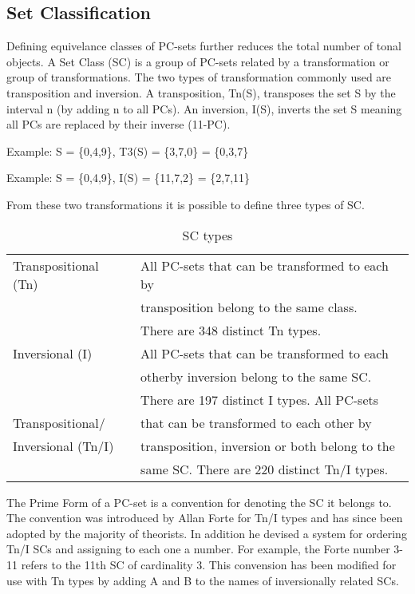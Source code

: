 \documentclass{article}
\begin{document}
\subsection{Set Classification}
\label{sec-3-2}

Defining equivelance classes of PC-sets further reduces the total
number of tonal objects. A Set Class (SC) is a group of PC-sets
related by a transformation or group of transformations. The two types
of transformation commonly used are transposition and inversion. A
transposition, Tn(S), transposes the set S by the interval n (by
adding n to all PCs). An inversion, I(S), inverts the set S meaning
all PCs are replaced by their inverse (11-PC). 

Example: S = \{0,4,9\}, T3(S) = \{3,7,0\} = \{0,3,7\}

Example: S = \{0,4,9\}, I(S) = \{11,7,2\} = \{2,7,11\}

From these two transformations it is possible to define three types of
SC.

\begin{table}[htb]
\caption{SC types} 
\begin{center}
\begin{tabular}{ll}
 Transpositional (Tn)  &  All PC-sets that can be transformed to each by  \\
                       &  transposition belong to the same class.         \\
                       &  There are 348 distinct Tn types.                \\
 Inversional (I)       &  All PC-sets that can be transformed to each     \\
                       &  otherby inversion belong to the same SC.        \\
                       &  There are 197 distinct I types. All PC-sets     \\
 Transpositional/      &  that can be transformed to each other by        \\
 Inversional (Tn/I)    &  transposition, inversion or both belong to the  \\
                       &  same SC. There are 220 distinct Tn/I types.     \\
\end{tabular}
\end{center}
\end{table}


The Prime Form of a PC-set is a convention for denoting the SC it
belongs to. The convention was introduced by Allan Forte for Tn/I
types and has since been adopted by the majority of theorists. In
addition he devised a system for ordering Tn/I SCs and assigning to
each one a number. For example, the Forte number 3-11 refers to the
11th SC of cardinality 3. This convension has been modified for use
with Tn types by adding A and B to the names of inversionally related
SCs.
\end{document}
